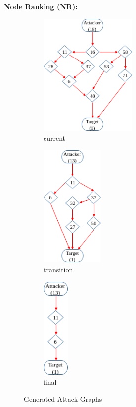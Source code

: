 % 


\textbf{Node Ranking (NR):  }

\begin{figure}[H]
\centering
\begin{subfigure}{.33\textwidth}
\includegraphics[width=\linewidth,height=6cm]{content/chapters/ch_background/sdn_analytics/2/figs/net_ags_003.png}
\caption{current}
\label{fig:ag_currt}
\end{subfigure}%
\begin{subfigure}{.33\textwidth}
\includegraphics[width=\linewidth,height=6cm]{content/chapters/ch_background/sdn_analytics/2/figs/net_ags_002.png}
\caption{transition}
\label{fig:ag_trans}
\end{subfigure}%
\begin{subfigure}{.2\textwidth}
\includegraphics[width=\linewidth,height=5cm]{content/chapters/ch_background/sdn_analytics/2/figs/net_ags_001.png}
\caption{final}
\label{fig:ag_fut}
\end{subfigure}%
\caption{Generated Attack Graphs}
\end{figure} 


